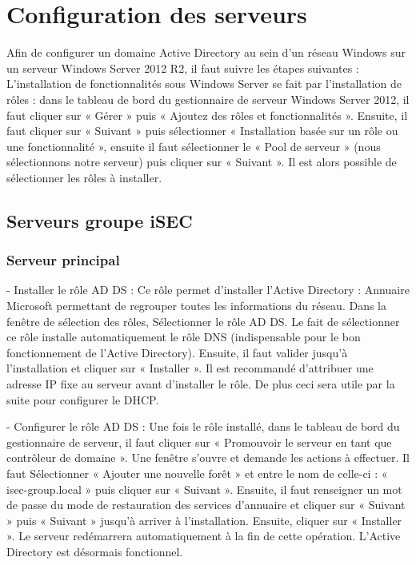 \section{Configuration des serveurs}

Afin de configurer un domaine Active Directory au sein d’un réseau Windows sur un serveur Windows Server 2012 R2, il faut suivre les étapes suivantes :
L’installation de fonctionnalités sous Windows Server se fait par l’installation de rôles : dans le tableau de bord du gestionnaire de serveur Windows Server 2012, il faut cliquer sur « Gérer » puis « Ajoutez des rôles et fonctionnalités ». Ensuite, il faut cliquer sur « Suivant » puis sélectionner « Installation basée sur un rôle ou une fonctionnalité », ensuite il faut sélectionner le « Pool de serveur » (nous sélectionnons notre serveur) puis cliquer sur « Suivant ». Il est alors possible de sélectionner les rôles à installer.


	\subsection{Serveurs groupe iSEC}	
		\subsubsection{Serveur principal}
-	Installer le rôle AD DS :
Ce rôle permet d’installer l’Active Directory : Annuaire Microsoft permettant de regrouper toutes les informations du réseau. 
Dans la fenêtre de sélection des rôles, Sélectionner le rôle AD DS. Le fait de sélectionner ce rôle installe automatiquement le rôle DNS (indispensable pour le bon fonctionnement de l’Active Directory).
Ensuite, il faut valider jusqu’à l’installation et cliquer sur « Installer ». Il est recommandé d’attribuer une adresse IP fixe au serveur avant d’installer le rôle. De plus ceci sera utile par la suite pour configurer le DHCP.

-	Configurer le rôle AD DS :
Une fois le rôle installé, dans le tableau de bord du gestionnaire de serveur, il faut cliquer sur « Promouvoir le serveur en tant que contrôleur de domaine ». Une fenêtre s’ouvre et demande les actions à effectuer. Il faut Sélectionner « Ajouter une nouvelle forêt » et entre le nom de celle-ci : « isec-group.local » puis cliquer sur « Suivant ». Ensuite, il faut renseigner un mot de passe du mode de restauration des services d’annuaire et cliquer sur « Suivant » puis « Suivant » jusqu’à arriver à l’installation. Ensuite, cliquer sur « Installer ». Le serveur redémarrera automatiquement à la fin de cette opération. L’Active Directory est désormais fonctionnel.

